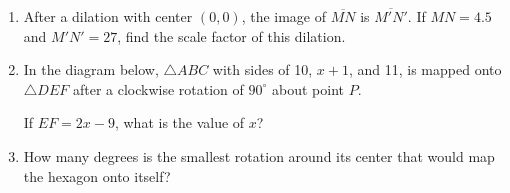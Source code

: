 \documentclass[12pt, twoside]{article}
\begin{document}
\begin{enumerate}
  \item After a dilation with center $(0,0)$, the image of $\overline{MN}$ is $\overline{M'N'}$. If $MN=4.5$ and $M'N'=27$, find the scale factor of this dilation. \vspace{3cm}


  \item In the diagram below, $\triangle ABC$ with sides of 10, $x+1$, and 11, is mapped onto $\triangle DEF$ after a clockwise rotation of $90^\circ$ about point $P$.
      \begin{center}
      \end{center}
    If $EF=2x-9$, what is the value of $x$? \vspace{3cm}


     \item How many degrees is the smallest rotation around its center that would map the hexagon onto itself?
       \begin{center}
         \end{center}


\end{enumerate}
\end{document}
